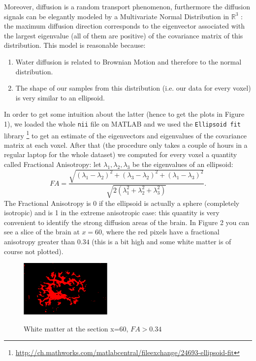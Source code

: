 \documentclass{article} %
\begin{document}
Moreover, diffusion is a random transport phenomenon, furthermore the diffusion signals can be elegantly modeled by a Multivariate Normal Distribution in $\mathbb{R}^3$  \cite{Alexander2007,basser:1994:eesd}: the maximum diffusion direction corresponds to the eigenvector associated with the largest eigenvalue (all of them are positive) of the covariance matrix of this distribution. This model is reasonable because:
\begin{enumerate}
\item Water diffusion is related to Brownian Motion and therefore to the normal distribution.
\item The shape of our samples from this distribution (i.e. our data for every voxel) is very similar to an ellipsoid.
\end{enumerate}
In order to get some intuition about the latter (hence to get the plots in Figure 1), we loaded the whole \texttt{nii} file on MATLAB and we used the \texttt{Ellipsoid fit} library \footnote{\url{http://ch.mathworks.com/matlabcentral/fileexchange/24693-ellipsoid-fit}}  
to get an estimate of the eigenvectors and eigenvalues of the covariance matrix at each voxel. After that (the procedure only takes a couple of hours in a regular laptop for the whole dataset) we computed for every voxel a quantity called Fractional Anisotropy\cite{Peeters2009,Mukherjee01042008}: let $\lambda_1, \lambda_2, \lambda_3$ be the eigenvalues of an ellipsoid:
\begin{equation}
FA = \frac{\sqrt{(\lambda_1-\lambda_2)^2+(\lambda_3-\lambda_2)^2+(\lambda_1-\lambda_3)^2}}{\sqrt{2(\lambda_1^2+\lambda_2^2+\lambda_3^2)}}.
\end{equation}
The Fractional Anisotropy is 0 if the ellipsoid is actually a sphere (completely isotropic) and is 1 in the extreme anisotropic case: this quantity is very convenient to identify the strong diffusion areas of the brain. In Figure 2 you can see a slice of the brain at $x=60$, where the red pixels have a fractional anisotropy greater than $0.34$ (this is a bit high and some white matter is of course not plotted).   

\begin{figure}[H]
  \centering
{\includegraphics[width=0.4\textwidth]{img/k0_34.PNG}\label{F}}
\caption{White matter at the section x=60, $FA > 0.34$}
\end{figure}
\end{document}
